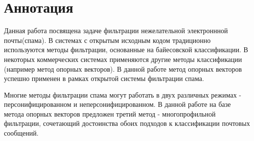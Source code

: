 \newpage
\section{Аннотация}

Данная работа посвящена задаче фильтрации нежелательной электроннной почты(спама). В системах с открытым исходным кодом традиционно используются методы фильтрации, основанные на байесовской классификации. В некоторых коммерческих системах применяются другие методы классификации (например метод опорных векторов). В данной работе метод опорных векторов успешно применен в рамках открытой системы фильтрации спама.

Многие методы фильтрации спама могут работать в двух различных режимах - персонифицированном и неперсонифицированном. В данной работе на базе метода опорных векторов предложен третий метод - многопрофильной фильтрации, сочетающий достоинства обоих подходов к классификации почтовых сообщений.
